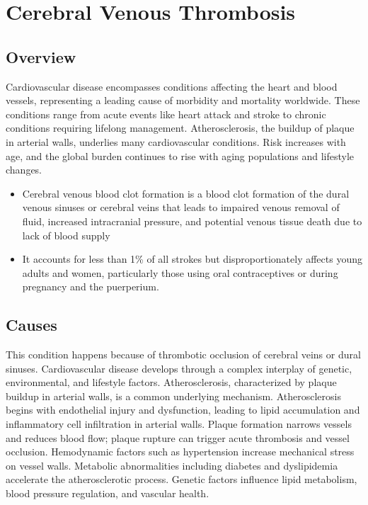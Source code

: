 \chapter{Cerebral Venous Thrombosis}
\label{sec:Cerebral Venous Thrombosis}

\section{Overview}
Cardiovascular disease encompasses conditions affecting the heart and blood vessels, representing a leading cause of morbidity and mortality worldwide. These conditions range from acute events like heart attack and stroke to chronic conditions requiring lifelong management. Atherosclerosis, the buildup of plaque in arterial walls, underlies many cardiovascular conditions. Risk increases with age, and the global burden continues to rise with aging populations and lifestyle changes.

\begin{itemize}[noitemsep]
  \item Cerebral venous blood clot formation is a blood clot formation of the dural venous sinuses or cerebral veins that leads to impaired venous removal of fluid, increased intracranial pressure, and potential venous tissue death due to lack of blood supply
  \item It accounts for less than 1\% of all strokes but disproportionately affects young adults and women, particularly those using oral contraceptives or during pregnancy and the puerperium.
\end{itemize}
\section{Causes}
This condition happens because of thrombotic occlusion of cerebral veins or dural sinuses. Cardiovascular disease develops through a complex interplay of genetic, environmental, and lifestyle factors. Atherosclerosis, characterized by plaque buildup in arterial walls, is a common underlying mechanism.   Atherosclerosis begins with endothelial injury and dysfunction, leading to lipid accumulation and inflammatory cell infiltration in arterial walls. Plaque formation narrows vessels and reduces blood flow; plaque rupture can trigger acute thrombosis and vessel occlusion. Hemodynamic factors such as hypertension increase mechanical stress on vessel walls. Metabolic abnormalities including diabetes and dyslipidemia accelerate the atherosclerotic process. Genetic factors influence lipid metabolism, blood pressure regulation, and vascular health.
